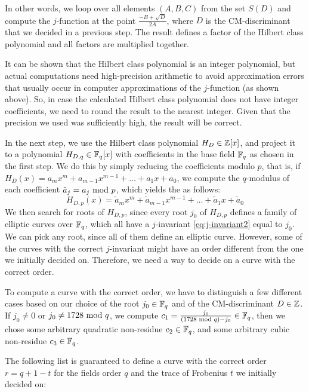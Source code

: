 In other words, we loop over all elements $(A,B,C)$ from the set $S(D)$ and compute the $j$-function at the point $\frac{-B + \sqrt{D}}{2A}$, where $D$ is the CM-discriminant that we decided in a previous step. The result defines a factor of the Hilbert class polynomial and all factors are multiplied together.

It can be shown that the Hilbert class polynomial is an integer polynomial, but actual computations need high-precision arithmetic to avoid approximation errors that usually occur in computer approximations of the $j$-function (as shown above). So, in case the calculated Hilbert class polynomial does not have integer coefficients, we need to round the result to the nearest integer. Given that the precision we used was sufficiently high, the result will be correct.

In the next step, we use the Hilbert class polynomial $H_D\in \mathbb{Z}[x]$, and project it to a polynomial $H_{D,q}\in\mathbb{F}_q[x]$ with coefficients in the base field $\mathbb{F}_q$ as chosen in the first step. We do this by simply reducing the coefficients modulo $p$, that is, if $H_D(x)= a_mx^m +a_{m-1}x^{m-1}+\ldots + a_1 x + a_0$, we compute the $q$-modulus of each coefficient
$\tilde{a}_j = a_j \text{ mod } p$, which yields the  as follows:
$$
H_{D,p}(x)=\tilde{a}_mx^m +\tilde{a}_{m-1}x^{m-1}+\ldots + \tilde{a}_1 x + \tilde{a}_0
$$
We then search for roots of $H_{D,p}$, since every root $j_0$ of $H_{D,p}$ defines a family of elliptic curves over $\mathbb{F}_q$, which all have a $j$-invariant \ref{eq:j-invariant2} equal to $j_0$. We can pick any root, since all of them define an elliptic curve. However, some of the curves with the correct $j$-invariant might have an order different from the one we initially decided on. Therefore, we need a way to decide on a curve with the correct order. 

To compute a curve with the correct order, we have to distinguish a few different cases based on our choice of the root $j_0\in \mathbb{F}_q$ and of the CM-discriminant $D\in \mathbb{Z}$. If $j_0\neq 0$ or $j_0\neq 1728 \text{ mod } q$, we compute $c_1=\frac{j_0}{(1728 \text{ mod } q) -j_0}\in \mathbb{F}_q$, then we chose some arbitrary quadratic non-residue $c_2\in \mathbb{F}_q$, and some arbitrary cubic non-residue $c_3\in \mathbb{F}_q$. 

The following list is guaranteed to define a curve with the correct order $r= q+1 -t$ for the fields order $q$ and the trace of Frobenius $t$ we initially decided on:

